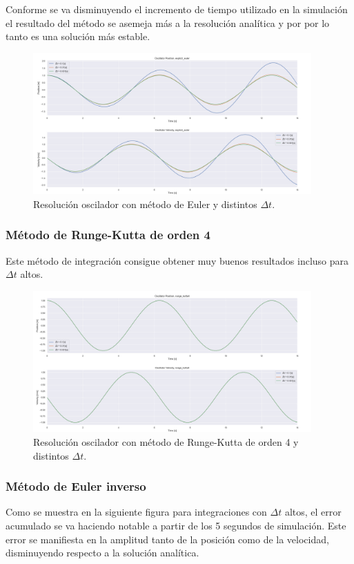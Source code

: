 \documentclass[12pt,a4paper]{article}
\begin{document}
Conforme se va disminuyendo el incremento de tiempo utilizado en la simulación el resultado del método se asemeja más a la resolución analítica y por por lo tanto es una solución más estable.
\begin{figure}[H]
	\centering
	\includegraphics[width=0.95\textwidth]{FIGURES/mil4/osci_euler.png}
	\caption{Resolución oscilador con método de Euler y distintos $\Delta t$.}
	\label{osci_euler}
\end{figure}


\subsubsection{Método de Runge-Kutta de orden 4}
Este método de integración consigue obtener muy buenos resultados incluso para $\Delta t$ altos. 
\begin{figure}[H]
	\centering
	\includegraphics[width=0.95\textwidth]{FIGURES/mil4/osci_rungekutta4.png}
	\caption{Resolución oscilador con método de Runge-Kutta de orden 4 y distintos $\Delta t$.}
	\label{osci_rungekutta4}
\end{figure}


\subsubsection{Método de Euler inverso}
Como se muestra en la siguiente figura para integraciones con $\Delta t$ altos, el error acumulado se va haciendo notable a partir de los 5 segundos de simulación. Este error se manifiesta en la amplitud tanto de la posición como de la velocidad, disminuyendo respecto a la solución analítica.
\end{document}
